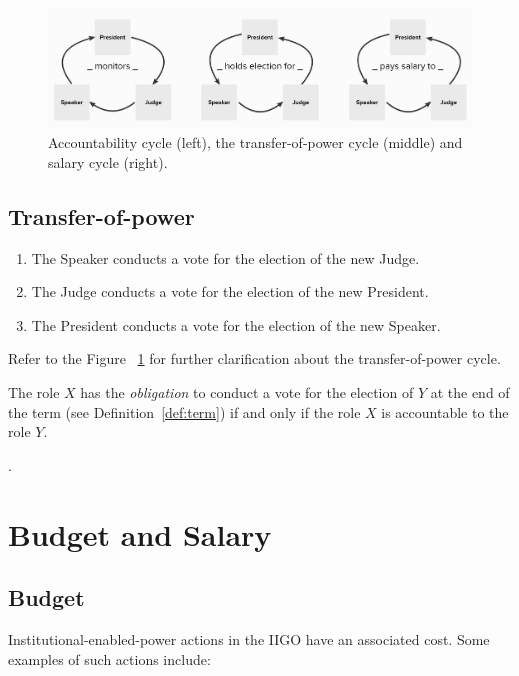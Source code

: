 \begin{figure}[!htb]
\centering
\includegraphics[scale=0.33]{05_iigo/images/role cycles.png}
\caption{Accountability cycle (left), the transfer-of-power cycle (middle) and salary cycle (right).}
\label{fig:cycles_in_IIGO}
\end{figure}


\subsection{Transfer-of-power}
\label{subsec:transfer-of-power}
\begin{enumerate}
    \item The Speaker conducts a vote for the election of the new Judge.
    \item The Judge conducts a vote for the election of the new President.
    \item The President conducts a vote for the election of the new Speaker.
\end{enumerate}
Refer to the Figure~ \ref{fig:cycles_in_IIGO} for further clarification about the transfer-of-power cycle.

\begin{rule_IIGO}
   The role $X$ has the \emph{obligation} to conduct a vote for the election of $Y$ at the end of the term (see Definition~\ref{def:term}) if and only if the role $X$ is accountable to the role $Y$. 
\end{rule_IIGO}.

\section{Budget and Salary}
\subsection{Budget}

Institutional-enabled-power actions in the IIGO have an associated cost. Some examples of such actions include:


